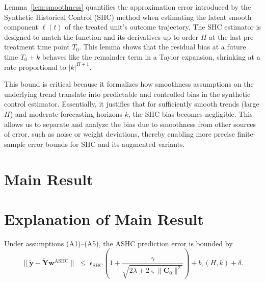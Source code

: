\documentclass{article}
\begin{document}
\begin{remark}
Lemma~\ref{lem:smoothness} quantifies the approximation error introduced by the Synthetic Historical Control (SHC) method when estimating the latent smooth component \(\ell(t)\) of the treated unit's outcome trajectory. The SHC estimator is designed to match the function and its derivatives up to order \(H\) at the last pre-treatment time point \(T_0\). This lemma shows that the residual bias at a future time \(T_0 + k\) behaves like the remainder term in a Taylor expansion, shrinking at a rate proportional to \(|k|^{H+1}\).

This bound is critical because it formalizes how smoothness assumptions on the underlying trend translate into predictable and controlled bias in the synthetic control estimator. Essentially, it justifies that for sufficiently smooth trends (large \(H\)) and moderate forecasting horizons \(k\), the SHC bias becomes negligible. This allows us to separate and analyze the bias due to smoothness from other sources of error, such as noise or weight deviations, thereby enabling more precise finite-sample error bounds for SHC and its augmented variants.
\end{remark}


\section*{Main Result}

\section*{Explanation of Main Result}

\begin{proposition}
\label{prop:ashc}
Under assumptions (A1)--(A5), the ASHC prediction error is bounded by
\[
\|\widetilde{\mathbf{y}} - \widetilde{\mathbf{Y}} \mathbf{w}^{\text{ASHC}}\|
\;\leq\;
\epsilon_{\text{SHC}}
\left(1 + \frac{\gamma}{\sqrt{2\lambda + 2\varsigma \|\mathbf{C}_0\|^2}} \right)
+ b_\epsilon(H,k) + \delta.
\]
\end{proposition}
\end{document}
